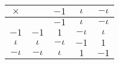 
\begin{table}[h]
	\label{cayleys_table}
	\begin{center}
		\begin{tabular}{c|cccc}
			$\times$ & \circled{$1$} & $-1$ & $\iota$ & $-\iota$ \\
			\hline
			\circled{$1$} & \circled{$1$} & $-1$ & $\iota$ & $-\iota$ \\
			$-1$ & $-1$ & $1$ & $-\iota$ & $\iota$ \\
			$\iota$ & $\iota$ & $-\iota$ & $-1$ & $1$ \\
			$-\iota$ & $-\iota$ & $\iota$ & $1$ & $-1$ \\
		\end{tabular}
	\end{center}
\end{table}